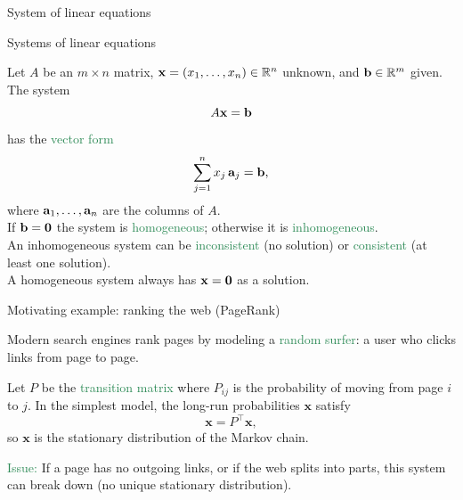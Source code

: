 \documentclass{beamer}
\begin{document}
\begin{frame} \begin{center}
	\alert{\Huge System of linear equations}
\end{center}\end{frame}


\begin{frame}{Systems of linear equations}
 
Let $A$ be an $m\times n$ matrix, ${\bf x}=(x_1,\ldots,x_n)\in\mathbb R^n$ unknown, and ${\bf b}\in\mathbb R^m$ given. The system
\[
A{\bf x}={\bf b}
\]
has the \textcolor{SeaGreen}{vector form}
\[
\sum_{j=1}^n x_j\,{\bf a}_j={\bf b},
\]
where ${\bf a}_1,\dots,{\bf a}_n$ are the columns of $A$.\\[6mm]

If ${\bf b}={\bf 0}$ the system is \textcolor{SeaGreen}{homogeneous}; otherwise it is \textcolor{SeaGreen}{inhomogeneous}.\\[3mm] 
An inhomogeneous system can be \textcolor{SeaGreen}{inconsistent} (no solution) or \textcolor{SeaGreen}{consistent} (at least one solution).\\[3mm]
 A homogeneous system always has ${\bf x}={\bf 0}$ as a solution.
 \end{frame}

\begin{frame}{Motivating example: ranking the web (PageRank)}

Modern search engines rank pages by modeling a \textcolor{SeaGreen}{random surfer}:  
a user who clicks links from page to page.

\medskip
Let \(P\) be the \textcolor{SeaGreen}{transition matrix} where \(P_{ij}\) is the probability of moving from page \(i\) to \(j\).  
In the simplest model, the long-run probabilities \(\mathbf{x}\) satisfy
\[
\mathbf{x} = P^{\top}\mathbf{x},
\]
so \(\mathbf{x}\) is the stationary distribution of the Markov chain.

\medskip
\textcolor{SeaGreen}{Issue:} If a page has no outgoing links, or if the web splits into parts, this system can break down (no unique stationary distribution).

\end{frame}
\end{document}

